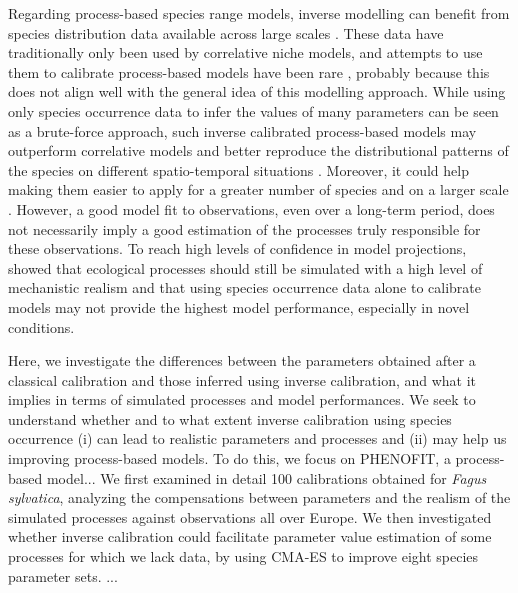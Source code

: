 \documentclass[letterpaper,8pt]{extarticle}  %
\begin{document}
\begin{doublespacing}
\begin{linenumbers}
Regarding process-based species range models, inverse modelling can benefit from species distribution data available across large scales \citep{Evans2016}. These data have traditionally only been used by correlative niche models, and attempts to use them to calibrate process-based models have been rare \citep{Higgins2012, VanderMeersch2023}, probably because this does not align well with the general idea of this modelling approach. While using only species occurrence data to infer the values of many parameters can be seen as a brute-force approach, such inverse calibrated process-based models may outperform correlative models and better reproduce the distributional patterns of the species on different spatio-temporal situations \citep{Higgins2020, VanderMeersch2024}.  Moreover, it could help making them easier to apply for a greater number of species and on a larger scale \citep[e.g.][]{Conradi2024}. However, a good model fit to observations, even over a long-term period, does not necessarily imply a good estimation of the processes truly responsible for these observations. 
To reach high levels of confidence in model projections,  \cite{VanderMeersch2024} showed that ecological processes should still be simulated with a high level of mechanistic realism and that using species occurrence data alone to calibrate models may not provide the highest model performance, especially in novel conditions. 

Here, we investigate the differences between the parameters obtained after a classical calibration and those inferred using inverse calibration, and what it implies in terms of simulated processes and model performances. We seek to understand whether and to what extent inverse calibration using species occurrence (i) can lead to realistic parameters and processes and (ii) may help us improving process-based models. To do this, we focus on PHENOFIT, a process-based model... We first examined in detail 100 calibrations obtained for \emph{Fagus sylvatica}, analyzing the compensations between parameters and the realism of the simulated processes against observations all over Europe. We then investigated whether inverse calibration could facilitate parameter value estimation of some processes for which we lack data, by using CMA-ES to improve eight species parameter sets. ...



\end{linenumbers}
\end{doublespacing}
\end{document}
